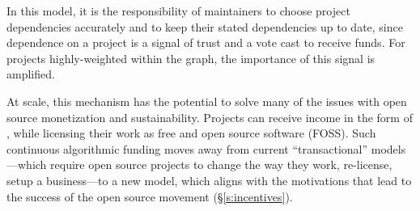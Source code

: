 
In this model, it is the responsibility of maintainers to choose project
dependencies accurately and to keep their stated dependencies up to date, since
dependence on a project is a signal of trust and a vote cast to receive funds.
For projects highly-weighted within the graph, the importance of this signal is amplified.

At scale, this mechanism has the potential to solve many of the issues with
open source monetization and sustainability. Projects can receive
income in the form of \oscoin{}, while licensing their work as free and
open source software (FOSS). Such continuous algorithmic funding moves
away from current ``transactional'' models---which require open source projects
to change the way they work, re-license, setup a business---to a new model,
which aligns with the motivations that lead to the success of the open source
movement (\S \ref{s:incentives}).

